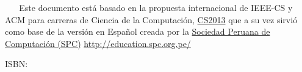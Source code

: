 \pagestyle{empty}

~
\vfill
~
Este documento está basado en la propuesta internacional de IEEE-CS y ACM para carreras de Ciencia de la Computación, \href{www.cs2013.org}{CS2013}
que a su vez sirvió como base de la versión en Español creada por la \href{www.spc.org.pe}{Sociedad Peruana de Computación (SPC)} \href{http://education.spc.org.pe/}{http://education.spc.org.pe/}

ISBN: 


\pagebreak


